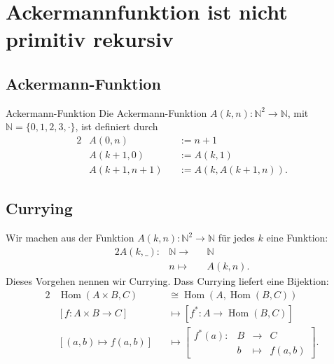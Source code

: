 \documentclass[a4paper]{amsart}
\theoremstyle{definition}
\DeclareMathOperator{\Hom}{Hom}
\newcommand{\N}{\ensuremath{\mathbb{ N }}}
\begin{document}
\section{Ackermannfunktion ist nicht primitiv rekursiv}

\subsection{Ackermann-Funktion}
\begin{Definition}{Ackermann-Funktion}
   Die Ackermann-Funktion $A(k,n) \colon \N^2 \to \N$, mit $\N = \{ 0, 1, 2, 3, \cdot \}$, ist definiert durch
   \begin{alignat}{2}
      &A( 0, n ) &&:= n+1\\
      &A( k+1, 0 ) &&:= A( k, 1 )\\
      &A( k+1, n+1 ) &&:= A( k, A( k+1, n )).
   \end{alignat}
\end{Definition}

\subsection{Currying}
Wir machen aus der Funktion $A(k,n) \colon \N^2 \to \N$ für jedes $k$ eine Funktion:
\begin{alignat}{2}
   A(k, \_) \colon &\N \to &&\N\\
                   & n \mapsto &&A(k,n).
\end{alignat}
Dieses Vorgehen nennen wir Currying. Dass Currying liefert eine Bijektion:
\begin{alignat}{2}
   &\Hom( A \times B, C )       &&\cong \Hom( A, \Hom( B, C ))\\
   &[f \colon A \times B \to C] &&\mapsto [ f^* \colon A \to \Hom( B, C )]\\
   &[(a,b) \mapsto f(a,b)]      &&\mapsto \begin{bmatrix}
                             f^*(a) \colon &B &\to     &C\\
                                           &b &\mapsto &f(a,b)
   \end{bmatrix}.
\end{alignat}
\end{document}
